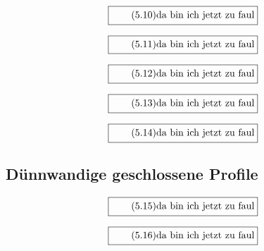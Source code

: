 \documentclass[11pt]{article}
\newcommand{\1}{ {\mathds{1}} }
\begin{document}
		\begin{equation}
			\boxed{
				\tag{5.10}
				\begin{split}
					\text{da bin ich jetzt zu faul}
				\end{split}
			}
		\end{equation}

		\begin{equation}
			\boxed{
				\tag{5.11}
				\begin{split}
					\text{da bin ich jetzt zu faul}
				\end{split}
			}
		\end{equation}

		\begin{equation}
			\boxed{
				\tag{5.12}
				\begin{split}
					\text{da bin ich jetzt zu faul}
				\end{split}
			}
		\end{equation}

		\begin{equation}
			\boxed{
				\tag{5.13}
				\begin{split}
					\text{da bin ich jetzt zu faul}
				\end{split}
			}
		\end{equation}

		\begin{equation}
			\boxed{
				\tag{5.14}
				\begin{split}
					\text{da bin ich jetzt zu faul}
				\end{split}
			}
		\end{equation}

		\subsection{Dünnwandige geschlossene Profile}

		\begin{equation}
			\boxed{
				\tag{5.15}
				\begin{split}
					\text{da bin ich jetzt zu faul}
				\end{split}
			}
		\end{equation}

		\begin{equation}
			\boxed{
				\tag{5.16}
				\begin{split}
					\text{da bin ich jetzt zu faul}
				\end{split}
			}
		\end{equation}
\end{document}
